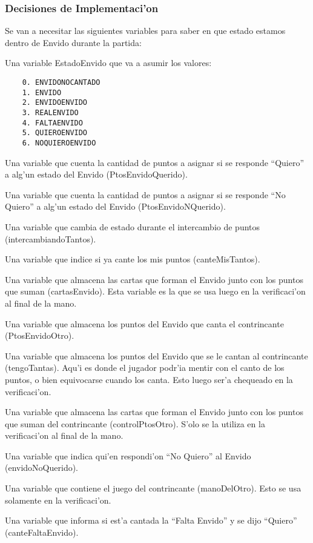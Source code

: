 \subsubsection{Decisiones de Implementaci'on}
Se van a necesitar las siguientes variables para saber en que estado estamos dentro de Envido durante la
partida:


Una variable EstadoEnvido que va a asumir los valores:

\begin{verbatim}
    0. ENVIDONOCANTADO
    1. ENVIDO
    2. ENVIDOENVIDO
    3. REALENVIDO
    4. FALTAENVIDO
    5. QUIEROENVIDO
    6. NOQUIEROENVIDO
\end{verbatim}

Una variable que cuenta la cantidad de puntos a asignar si se responde ``Quiero'' a alg'un estado del Envido (PtosEnvidoQuerido).

Una variable que cuenta la cantidad de puntos a asignar si se responde ``No Quiero'' a alg'un estado del Envido (PtosEnvidoNQuerido).

Una variable que cambia de estado durante el intercambio de puntos (intercambiandoTantos).

Una variable que indice si ya cante los mis puntos (canteMisTantos).

Una variable que almacena las cartas que forman el Envido junto con los puntos que suman (cartasEnvido). Esta variable es la que se usa luego en la verificaci'on al final de la mano.

Una variable que almacena los puntos del Envido que canta el contrincante (PtosEnvidoOtro).

Una variable que almacena los puntos del Envido que se le cantan al contrincante (tengoTantas). Aqu'i es donde el jugador podr'ia mentir con el canto de los puntos, o bien equivocarse cuando los canta. Esto luego ser'a chequeado en la verificaci'on.

Una variable que almacena las cartas que forman el Envido junto con los puntos que suman del contrincante (controlPtosOtro). S'olo se la utiliza en la verificaci'on al final de la mano.

Una variable que indica qui'en respondi'on ``No Quiero'' al Envido (envidoNoQuerido).

Una variable que contiene el juego del contrincante (manoDelOtro). Esto se usa solamente en la verificaci'on.

Una variable que informa si est'a cantada la ``Falta Envido'' y se dijo ``Quiero'' (canteFaltaEnvido).


